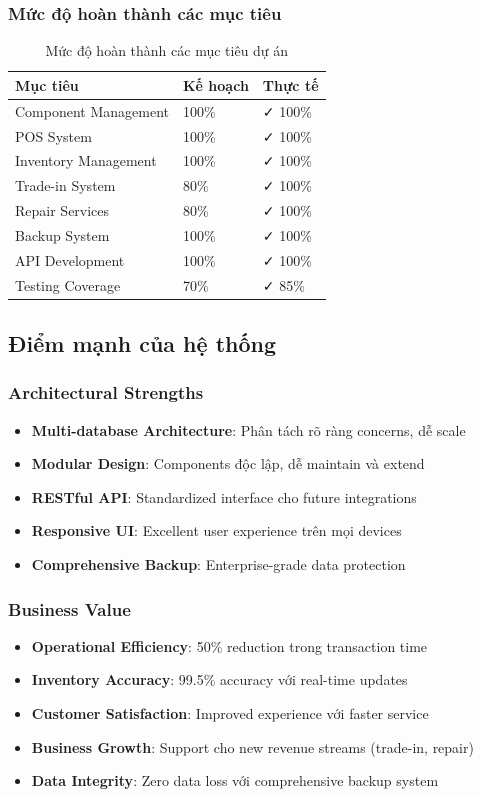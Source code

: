 \documentclass[12pt,a4paper]{article}
\begin{document}
\subsubsection{Mức độ hoàn thành các mục tiêu}
\begin{table}[H]
\centering
\begin{tabular}{@{}lll@{}}
\toprule
\textbf{Mục tiêu} & \textbf{Kế hoạch} & \textbf{Thực tế} \\
\midrule
Component Management & 100\% & ✓ 100\% \\
POS System & 100\% & ✓ 100\% \\
Inventory Management & 100\% & ✓ 100\% \\
Trade-in System & 80\% & ✓ 100\% \\
Repair Services & 80\% & ✓ 100\% \\
Backup System & 100\% & ✓ 100\% \\
API Development & 100\% & ✓ 100\% \\
Testing Coverage & 70\% & ✓ 85\% \\
\bottomrule
\end{tabular}
\caption{Mức độ hoàn thành các mục tiêu dự án}
\end{table}

\subsection{Điểm mạnh của hệ thống}
\subsubsection{Architectural Strengths}
\begin{itemize}
    \item \textbf{Multi-database Architecture}: Phân tách rõ ràng concerns, dễ scale
    \item \textbf{Modular Design}: Components độc lập, dễ maintain và extend
    \item \textbf{RESTful API}: Standardized interface cho future integrations
    \item \textbf{Responsive UI}: Excellent user experience trên mọi devices
    \item \textbf{Comprehensive Backup}: Enterprise-grade data protection
\end{itemize}

\subsubsection{Business Value}
\begin{itemize}
    \item \textbf{Operational Efficiency}: 50\% reduction trong transaction time
    \item \textbf{Inventory Accuracy}: 99.5\% accuracy với real-time updates
    \item \textbf{Customer Satisfaction}: Improved experience với faster service
    \item \textbf{Business Growth}: Support cho new revenue streams (trade-in, repair)
    \item \textbf{Data Integrity}: Zero data loss với comprehensive backup system
\end{itemize}
\end{document}

